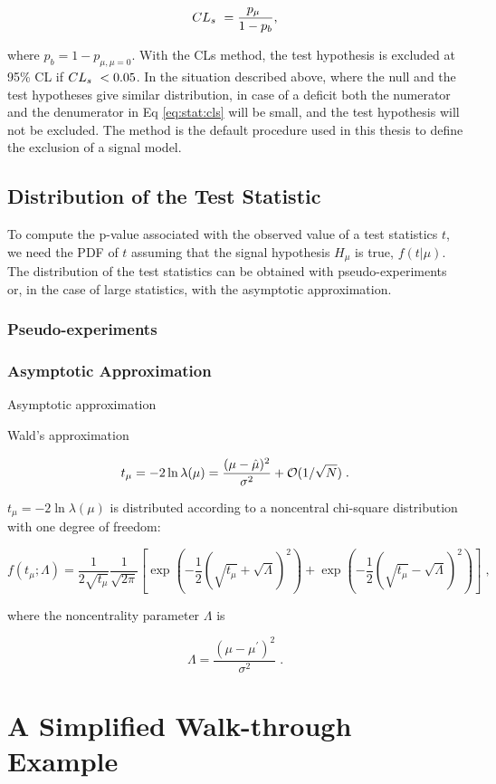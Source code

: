 \begin{equation}
\label{eq:stat:cls}
CL_s \  = \dfrac{p_\mu \ }{1 - p_b} , 
\end{equation}

\noindent where $p_b = 1 - p_{\mu, \mu=0}$. With the CLs method, the test hypothesis is excluded at 95\% CL if $CL_s \  < 0.05$. In the situation described above, where the null and the test hypotheses give similar \qmu distribution, in case of a deficit both the numerator and the denumerator in Eq \ref{eq:stat:cls} will be small, and the test hypothesis will not be excluded. The \cls method is the default procedure used in this thesis to define the exclusion of a signal model. 

\subsection{Distribution of the Test Statistic}

To compute the p-value associated with the observed value of a test statistics $t$, we need the PDF of $t$ assuming that the signal hypothesis $H_\mu$ is true, $ f(t | \mu ) $. The distribution of the test statistics can be obtained with pseudo-experiments or, in the case of large statistics, with the asymptotic approximation. 

\subsubsection*{Pseudo-experiments}


\subsubsection*{Asymptotic Approximation}
Asymptotic approximation \cite{Cowan2011}

\noindent Wald's approximation \cite{Wald1943}

\begin{equation}
\label{eq:wald}
t_{\mu} = -2 \ln \lambda(\mu)
= \frac{(\mu - \hat{\mu})^2}{\sigma^2} + {\cal  O}(1/\sqrt{N}) \;.
\end{equation}

 $t_{\mu} = -2 \ln \lambda(\mu)$ is distributed according to a noncentral chi-square distribution with one degree of freedom:

\begin{equation}
\label{eq:stat:ftmulambda}
f(t_{\mu};\Lambda) = \frac{1}{2 \sqrt{t_{\mu}}} \frac{1}{\sqrt{2 \pi}}
\left[ \exp \left( - \frac{1}{2}
\left( \sqrt{t_{\mu}} + \sqrt{\Lambda} \right)^2 \right) +
\exp \left( - \frac{1}{2} \left( \sqrt{t_{\mu}} - \sqrt{\Lambda} \right)^2
\right) \right] \;,
\end{equation}

\noindent where the noncentrality parameter $\Lambda$ is

\begin{equation}
\label{eq:stat:noncentrality}
\Lambda = \frac{(\mu - \mu^{\prime})^2}{\sigma^2} \;.
\end{equation}


\section{A Simplified Walk-through Example}

